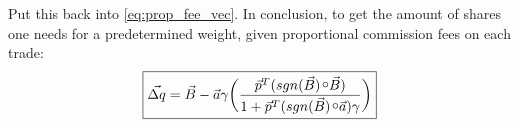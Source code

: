 \documentclass[12pt]{article}
\newcommand\ocirc[1]{\ensurestackMath{\stackon[1pt]{#1}{\mkern2mu\circ}}}
\begin{document}
Put this back into \ref{eq:prop_fee_vec}. In conclusion, to get the amount of shares one needs for a predetermined weight, given proportional commission fees on each trade:
\begin{equation}
    \boxed{ \vec{\Delta q} = \vec{B} - \vec{a} \gamma  \bigg (\dfrac{\vec{p}^T(sgn(\vec{B}) \ocirc{}  \vec{B})}{1 + \vec{p}^T(sgn(\vec{B}) \ocirc{} \vec{a} ) \gamma} \bigg )}
\end{equation}
\end{document}
